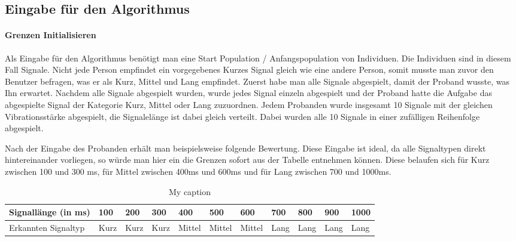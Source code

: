 
\subsection{Eingabe f{\"u}r den Algorithmus}
\paragraph{Grenzen Initialisieren}
Als Eingabe f{\"u}r den Algorithmus ben{\"o}tigt man eine Start Population / Anfangspopulation von Individuen. Die Individuen sind in diesem Fall Signale. 
Nicht jede Person empfindet ein vorgegebenes Kurzes Signal gleich wie eine andere Person, somit musste man zuvor den Benutzer befragen, was er als Kurz, Mittel und Lang empfindet. Zuerst habe man alle Signale abgespielt, damit der Proband wusste, was Ihn erwartet. 
Nachdem alle Signale abgespielt wurden, wurde jedes Signal einzeln abgespielt und der Proband hatte die Aufgabe das abgespielte Signal der Kategorie Kurz, Mittel oder Lang zuzuordnen. 
Jedem Probanden wurde insgesamt 10 Signale mit der gleichen Vibrationsst{\"a}rke abgespielt, die Signalel{\"a}nge ist dabei gleich verteilt.
Dabei wurden alle 10 Signale in einer zuf{\"a}lligen Reihenfolge abgespielt.

Nach der Eingabe des Probanden erh{\"a}lt man beispielsweise folgende Bewertung. Diese Eingabe ist ideal, da alle Signaltypen direkt hintereinander vorliegen, so w{\"u}rde man hier ein die Grenzen sofort aus der Tabelle entnehmen k{\"o}nnen. Diese belaufen sich f{\"u}r Kurz zwischen 100 und 300 ms, f{\"u}r Mittel zwischen 400ms und 600ms und f{\"u}r Lang zwischen 700 und 1000ms.

\begin{table}[]
\centering
\caption{My caption}
\label{my-label}
\begin{tabular}{|l|l|l|l|l|l|l|l|l|l|l|}
\hline
 Signall{\"a}nge (in ms) & 100 & 200 & 300 & 400 & 500 & 600 & 700 & 800 & 900 & 1000 \\ \hline
 Erkannten Signaltyp & Kurz & Kurz & Kurz & Mittel & Mittel & Mittel & Lang & Lang & Lang & Lang \\ \hline
\end{tabular}
\end{table}

